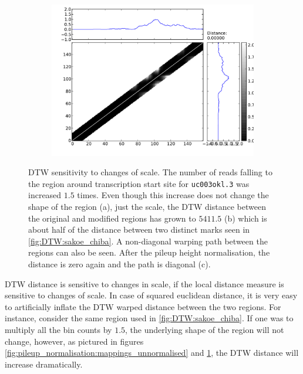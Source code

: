 \documentclass[parskip]{cs4rep}
\newcommand{\gene}[1]{{\tt #1}}
\begin{document}
\begin{figure}
\begin{subfigure}[b]{0.3\textwidth}
       \caption{}
       \label{fig:pileup_normalisation:cost_unnormalised}
   \end{subfigure}
   ~
   \begin{subfigure}[b]{0.3\textwidth}
       \includegraphics[width=\textwidth]{figures/methods/pileup_normalisation/cost_x_1_5_x_normalised.pdf}
       \caption{}
       \label{fig:pileup_normalisation:cost_normalised}
   \end{subfigure}
   \caption{DTW sensitivity to changes of scale. The number of reads falling to the region around transcription start site for \gene{uc003okl.3} was increased $1.5$ times. Even though this increase does not change the shape of the region (a), just the scale, the DTW distance between the original and modified regions has grown to $5411.5$ (b) which is about half of the distance between two distinct marks seen in \autoref{fig:DTW:sakoe_chiba}. A non-diagonal warping path between the regions can also be seen. After the pileup height normalisation, the distance is zero again and the path is diagonal (c).}
   \label{fig:pileup_normalisation}
\end{figure}

DTW distance is sensitive to changes in scale, if the local distance measure is sensitive to changes of scale.
In case of squared euclidean distance, it is very easy to artificially inflate the DTW warped distance between the two regions. For instance, consider the same region used in \autoref{fig:DTW:sakoe_chiba}. If one was to multiply all the bin counts by $1.5$, the underlying shape of the region will not change, however, as pictured in figures \ref{fig:pileup_normalisation:mappings_unnormalised} and \ref{fig:pileup_normalisation:cost_unnormalised}, the DTW distance will increase dramatically.
\end{document}
